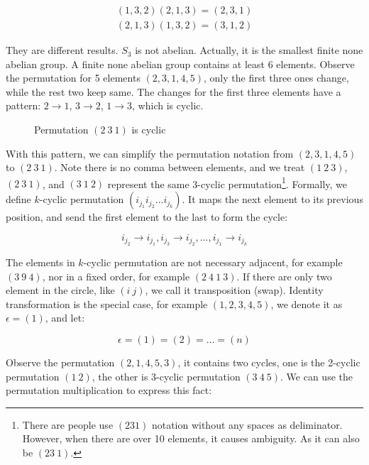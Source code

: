 \documentclass[b5paper]{article}
\begin{document}
\[
\begin{array}{l}
(1, 3, 2) (2, 1, 3) = (2, 3, 1) \\
(2, 1, 3) (1, 3, 2) = (3, 1, 2)
\end{array}
\]

They are different results. $S_3$ is not abelian. Actually, it is the smallest finite none abelian group. A finite none abelian group contains at least 6 elements. Observe the permutation for 5 elements $(2, 3, 1, 4, 5)$, only the first three ones change, while the rest two keep same. The changes for the first three elements have a pattern: $2 \to 1$, $3 \to 2$, $1 \to 3$, which is cyclic.

\begin{figure}[htbp]
\centering
{}
\caption{Permutation $(2\ 3\ 1)$ is cyclic}
\label{fig:cycle-permutation}
\end{figure}

With this pattern, we can simplify the permutation notation from $(2, 3, 1, 4, 5)$ to $(2\ 3\ 1)$. Note there is no comma between elements, and we treat $(1\ 2\ 3)$, $(2\ 3\ 1)$, and $(3\ 1\ 2)$ represent the same 3-cyclic permutation\footnote{There are people use $(231)$ notation without any spaces as deliminator. However, when there are over 10 elements, it causes ambiguity. As it can also be $(23\ 1)$.}. Formally, we define $k$-cyclic permutation $(i_{j_1} i_{j_2} ... i_{j_k})$. It maps the next element to its previous position, and send the first element to the last to form the cycle:

\[
i_{j_2} \to i_{j_1}, i_{j_3} \to i_{j_2}, ..., i_{j_1} \to i_{j_k}
\]

The elements in $k$-cyclic permutation are not necessary adjacent, for example $(3\ 9\ 4)$, nor in a fixed order, for example $(2\ 4\ 1\ 3)$. If there are only two element in the circle, like $(i\ j)$, we call it transposition (swap). Identity transformation is the special case, for example $(1, 2, 3, 4, 5)$, we denote it as $\epsilon = (1)$, and let:

\[
\epsilon = (1) = (2) = ... = (n)
\]

Observe the permutation $(2, 1, 4, 5, 3)$, it contains two cycles, one is the 2-cyclic permutation $(1\ 2)$, the other is 3-cyclic permutation $(3\ 4\ 5)$. We can use the permutation multiplication to express this fact:
\end{document}
